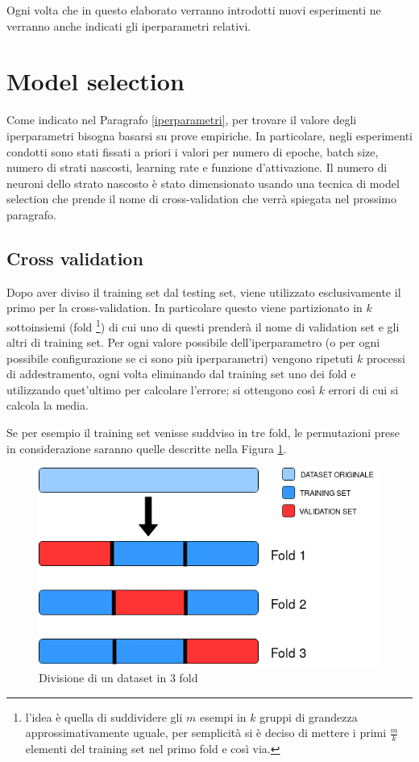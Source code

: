 \documentclass[12pt]{report}
\begin{document}
Ogni volta che in questo elaborato verranno introdotti nuovi esperimenti ne verranno anche indicati gli iperparametri relativi.

\section{Model selection}\label{modelselection}
Come indicato nel Paragrafo \ref{iperparametri}, per trovare il valore degli iperparametri bisogna basarsi su prove empiriche. In particolare, negli esperimenti condotti sono stati fissati a priori i valori per numero di epoche, batch size, numero di strati nascosti, learning rate e funzione d'attivazione. Il numero di neuroni dello strato nascosto è stato dimensionato usando una tecnica di model selection che prende il nome di cross-validation che verrà spiegata nel prossimo paragrafo.

\subsection{Cross validation}\label{crossvalidation}
Dopo aver diviso il training set dal testing set, viene utilizzato esclusivamente  il primo per la cross-validation. In particolare questo viene partizionato in $k$ sottoinsiemi (fold \footnote{l'idea è quella di suddividere gli $m$ esempi in $k$ gruppi di grandezza approssimativamente uguale, per semplicità si è deciso di mettere i primi $\frac{m}{k}$ elementi del training set nel primo fold e così via.}) di cui uno di questi prenderà il nome di validation set e gli altri di training set. Per ogni valore possibile dell'iperparametro (o per ogni possibile configurazione se ci sono più iperparametri) vengono ripetuti $k$ processi di addestramento, ogni volta eliminando dal training set uno dei fold e utilizzando quet'ultimo per calcolare l'errore; si ottengono così $k$ errori di cui si calcola la media.

Se per esempio il training set venisse suddviso in tre fold, le permutazioni prese in considerazione saranno quelle descritte nella Figura \ref{foldDiagram}.

\begin{figure}[H]
\begin{center}
\includegraphics[scale=0.45]{foldDiagram.png}
\caption{Divisione di un dataset in 3 fold}
\label{foldDiagram}
\end{center}
\end{figure}
\end{document}
